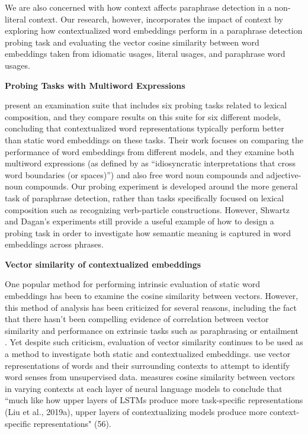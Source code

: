 \documentclass[11pt,a4paper]{article}
\begin{document}
We are also concerned with how context affects paraphrase detection in a non-literal context. Our research, however, incorporates the impact of context by exploring how contextualized word embeddings perform in a paraphrase detection probing task and evaluating the vector cosine similarity between word embeddings taken from idiomatic usages, literal usages, and paraphrase word usages.


\vspace{2mm}
\noindent\textbf{Probing Tasks with Multiword Expressions} 

\noindent \citet{shwartz2019pain} present an examination suite that includes six probing tasks related to lexical composition, and they compare results on this suite for six different models, concluding that contextualized word representations typically perform better than static word embeddings on these tasks. Their work focuses on comparing the performance of word embeddings from different models, and they examine both multiword expressions (as defined by \citet{10.5555/647344.724004} as ``idiosyncratic interpretations that cross word boundaries (or spaces)”) and also free word noun compounds and adjective-noun compounds. Our probing experiment is developed around the more general task of paraphrase detection, rather than tasks specifically focused on lexical composition such as recognizing verb-particle constructions. However, Shwartz and Dagan's experiments still provide a useful example of how to design a probing task in order to investigate how semantic meaning is captured in word embeddings across phrases.


\vspace{2mm}
\noindent\textbf{Vector similarity of contextualized embeddings} 


\noindent  One popular method for performing intrinsic evaluation of static word embeddings has been to examine the cosine similarity between vectors. However, this method of analysis has been criticized for several reasons, including the fact that there hasn't been compelling evidence of correlation between vector similarity and performance on extrinsic tasks such as paraphrasing or entailment \cite{faruqui-etal-2016-problems}. Yet despite such criticism, evaluation of vector similarity continues to be used as a method to investigate both static and contextualized embeddings. \citet{huang_cho_bowman_2020} use vector representations of words and their surrounding contexts to attempt to identify word senses from unsupervised data. \citet{ethayarajh2019contextual} measures cosine similarity between vectors in varying contexts at each layer of neural language models to conclude that  ``much like how upper layers of LSTMs produce more task-specific
representations (Liu et al., 2019a), upper layers of contextualizing models produce more context-specific representations" (56).
\end{document}
